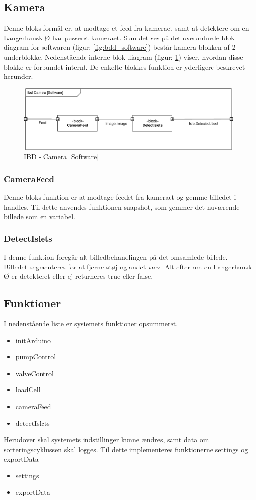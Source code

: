 \newpage
\subsection{Kamera}
Denne bloks formål er, at modtage et feed fra kameraet samt at detektere om en Langerhansk Ø har passeret kameraet. Som det ses på det overordnede blok diagram for softwaren (figur: \ref{fig:bdd_software}) består kamera blokken af 2 underblokke. Nedenstående interne blok diagram (figur: \ref{fig:ibd_software_camera}) viser, hvordan disse blokke er forbundet internt. De enkelte blokkes funktion er yderligere beskrevet herunder.
\begin{figure}[H]
	\centering
	\includegraphics[width=1\textwidth]{billeder/IBD_Software_Kamera-crop.pdf}
	\caption{IBD - Camera [Software]}
	\label{fig:ibd_software_camera}
\end{figure}

\subsubsection{CameraFeed}
Denne bloks funktion er at modtage feedet fra kameraet og gemme billedet i handles. Til dette anvendes funktionen snapshot, som gemmer det nuværende billede som en variabel.  
\subsubsection{DetectIslets}
I denne funktion foregår alt billedbehandlingen på det omsamlede billede. Billedet segmenteres for at fjerne støj og andet væv. Alt efter om en Langerhansk Ø er detekteret eller ej returneres true eller false. 

\newpage
\subsection{Funktioner}
I nedenstående liste er systemets funktioner opsummeret. 
\begin{itemize}
\item initArduino
\item pumpControl 
\item valveControl 
\item loadCell 
\item cameraFeed 
\item detectIslets 
\end{itemize}
Herudover skal systemets indstillinger kunne ændres, samt data om sorteringscyklussen skal logges. Til dette implementeres funktionerne settings og exportData 
\begin{itemize}
\item settings 
\item exportData 
\end{itemize}

\newpage







